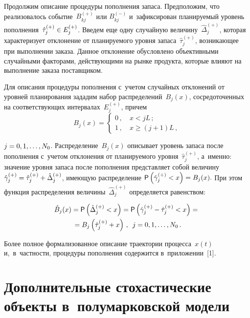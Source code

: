 \begin{multicols}{2}
  Продолжим описание процедуры пополнения запаса. Предположим, что 
реализовалось событие~$B_{kj}^{(+)}$ или $B_{kj}^{(-)}$ и~зафиксирован 
планируемый уровень пополнения~$\hat{\tau}_j^{(+)}\hm\in E_j^{(+)}$. 
Введем еще одну случайную величину~$\hat{\Delta}_j^{(+)}$, которая 
характеризует отклонение от планируемого уровня 
запаса~$\hat{\tau}_j^{(+)}$, возникающее при выполнении заказа. Данное 
отклонение обусловлено объективными случайными факторами, 
действующими на рынке продукта, которые влияют на выполнение заказа 
поставщиком. 
  
  Для описания процедуры пополнения с~учетом случайных отклонений от 
уровней планирования зададим набор распределений~$B_j(x)$, 
сосредоточенных на соответствующих интервалах~$E_j^{(+)}$, причем 
$$
B_j(x)=
\begin{cases}
0\,, &\ x< jL\,;\\
1\,, &\ x\geq (j+1)L\,,
\end{cases}
$$ 


\noindent
$j\hm=0,1,\ldots, N_0$. Распределение~$B_j(x)$ описывает уровень запаса 
после пополнения с~учетом отклонения от планируемого уровня~$\hat{\tau}_j^{(+)}$, 
а~именно: значение уровня запаса после пополнения пред\-став\-ля\-ет 
собой величину $\hat{\gamma}_j^{(+)} \hm= \hat{\tau}_j^{(+)} \hm+ 
\hat{\Delta}_j^{(+)}$, имеющую распределение 
${\sf P}\left( 
\hat{\gamma}_j^{(+)}\hm< x\right)\hm= B_j(x).$
 При этом функция 
распределения величины~$\hat{\Delta}_j^{(+)}$ определяется равенством: 

\noindent
  \begin{multline*}
  \hat{B}_j(x) ={\sf P}\left( \hat{\Delta}_j^{(+)} <x\right) ={\sf P}\left( 
\hat{\gamma}_j^{(+)} -\hat{\tau}_j^{(+)} <x\right) ={}\\
{}= B_j \left( \hat{\tau}_j^{(+)} 
+x\right)\,,\enskip
  j=0,1,\ldots , N_0\,.
  \end{multline*}
  
  Более полное формализованное описание траектории процесса~$x(t)$ 
и,~в~частности, процедуры пополнения содержится в~приложении~[1].
  
  \section{Дополнительные стохастические объекты 
в~полумарковской модели}
  

\end{multicols}
